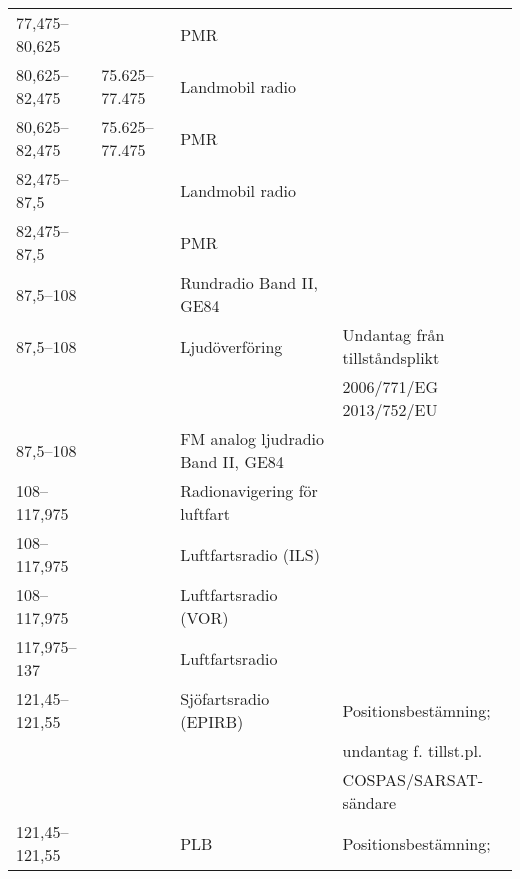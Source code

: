 \begin{landscape}
\begin{longtable}{llll}
	77,475--80,625     &                    & PMR                                   &                                \\
	80,625--82,475     & 75.625--77.475     & Landmobil radio                       &                                \\
	80,625--82,475     & 75.625--77.475     & PMR                                   &                                \\
	82,475--87,5       &                    & Landmobil radio                       &                                \\
	82,475--87,5       &                    & PMR                                   &                                \\
	87,5--108          &                    & Rundradio	Band II, GE84           &                                \\
	87,5--108          &                    & Ljudöverföring                        & Undantag från tillståndsplikt  \\
	                   &                    &                                       & 2006/771/EG 2013/752/EU        \\
	87,5--108          &                    & FM analog ljudradio	Band II, GE84   &                                \\
	108--117,975       &                    & Radionavigering för luftfart          &                                \\
	108--117,975       &                    & Luftfartsradio (ILS)                  &                                \\
	108--117,975       &                    & Luftfartsradio (VOR)                  &                                \\
	117,975--137       &                    & Luftfartsradio                        &                                \\
	121,45--121,55     &                    & Sjöfartsradio (EPIRB)                 & Positionsbestämning;           \\
	                   &                    &                                       & undantag f. tillst.pl.         \\
	                   &                    &                                       & COSPAS/SARSAT-sändare          \\
	121,45--121,55     &                    & PLB                                   & Positionsbestämning;           \\

\end{longtable}
\end{landscape}
